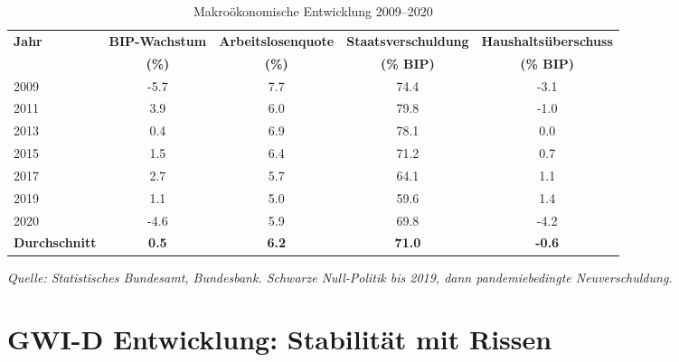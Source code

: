\begin{table}[ht]
    \centering
    \caption{Makroökonomische Entwicklung 2009–2020}
    \label{tab:makro_krisen}
    \begin{tabular}{lcccc}
        \toprule
        \textbf{Jahr} & \textbf{BIP-Wachstum} & \textbf{Arbeitslosenquote} & \textbf{Staatsverschuldung} & \textbf{Haushaltsüberschuss} \\
        & \textbf{(\%)} & \textbf{(\%)} & \textbf{(\% BIP)} & \textbf{(\% BIP)} \\
        \midrule
        2009 & -5.7 & 7.7 & 74.4 & -3.1 \\
        2011 & 3.9 & 6.0 & 79.8 & -1.0 \\
        2013 & 0.4 & 6.9 & 78.1 & 0.0 \\
        2015 & 1.5 & 6.4 & 71.2 & 0.7 \\
        2017 & 2.7 & 5.7 & 64.1 & 1.1 \\
        2019 & 1.1 & 5.0 & 59.6 & 1.4 \\
        2020 & -4.6 & 5.9 & 69.8 & -4.2 \\
        \midrule
        \textbf{Durchschnitt} & \textbf{0.5} & \textbf{6.2} & \textbf{71.0} & \textbf{-0.6} \\
        \bottomrule
    \end{tabular}
\end{table}

\begin{flushleft}
\footnotesize{\textit{Quelle: Statistisches Bundesamt, Bundesbank. Schwarze Null-Politik bis 2019, dann pandemiebedingte Neuverschuldung.}}
\end{flushleft}

\section{GWI-D Entwicklung: Stabilität mit Rissen}

